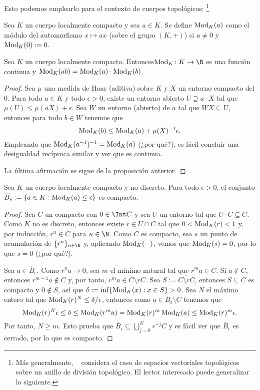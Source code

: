 \documentclass[teoria-numeros.tex]{subfiles}
\begin{document}
Esto podemos emplearlo para el contexto de cuerpos topológicos:%
\footnote{Más generalmente, \citeauthor{weil:basic}~\cite{weil:basic} considera el caso de espacios vectoriales topológicos
sobre un anillo de división topológico. El lector interesado puede generalizar lo siguiente.}
\begin{mydef}
	Sea $K$ un cuerpo localmente compacto y sea $a \in K$.
	Se define $\operatorname{Mod}_K(a)$ como el módulo del automorfismo $x \mapsto ax$ (sobre el grupo $(K, +)$) si $a \ne 0$ y $\operatorname{Mod}_K(0) := 0$.
\end{mydef}
\begin{prop}
	Sea $K$ un cuerpo localmente compacto.
	Entonces\break $\Mod_K \colon K \to \R$ es una función continua y $\operatorname{Mod}_K(ab) = \operatorname{Mod}_K(a) \cdot \operatorname{Mod}_K(b)$.
\end{prop}
\begin{proof}
	Sea $\mu$ una medida de Haar (aditiva) sobre $K$ y $X$ un entorno compacto del 0.
	Para todo $a \in K$ y todo $\epsilon > 0$, existe un entorno abierto $U \supseteq a\cdot X$ tal que $\mu(U) \le \mu(aX) + \epsilon$.
	Sea $W$ un entorno (abierto) de $a$ tal que $WX \subseteq U$, entonces para todo $b \in W$ tenemos que
	$$ \operatorname{Mod}_K(b) \le \operatorname{Mod}_K(a) + \mu(X)^{-1}\epsilon. $$
	Empleando que $\operatorname{Mod}_K(a^{-1})^{-1} = \operatorname{Mod}_K(a)$ (¿por qué?), es fácil concluir una desigualdad recíproca similar y ver que es continua.

	La última afirmación se sigue de la proposición anterior.
\end{proof}

\begin{thm}
	Sea $K$ un cuerpo localmente compacto y no discreto.
	Para todo $\epsilon > 0$, el conjunto $\overline{B}_\epsilon := \{ a \in K : \operatorname{Mod}_K(a) \le \epsilon \}$ es compacto.
\end{thm}
\begin{proof}
	Sea $C$ un compacto con $0 \in \Int C$ y sea $U$ un entorno tal que $U\cdot C \subseteq C$.
	Como $K$ no es discreto, entonces existe $r \in U \cap C$ tal que $0 < \operatorname{Mod}_K(r) < 1$ y, por inducción, $r^n \in C$ para $n \in \N$.
	Como $C$ es compacto, sea $s$ un punto de acumulación de $\{ r^n \}_{n\in\N}$ y, aplicando $\operatorname{Mod}_K(-)$, vemos que $\operatorname{Mod}_K(s) = 0$,
	por lo que $s = 0$ (¿por qué?).

	Sea $a \in \overline{B}_\epsilon$. Como $r^n a \to 0$, sea $m$ el mínimo natural tal que $r^m a \in C$.
	Si $a \notin C$, entonces $r^{m-1} a \notin C$ y, por tanto, $r^m a \in C \setminus rC$.
	Sea $S := \overline{C \setminus rC}$, entonces $S \subseteq C$ es compacto y $0 \notin S$, así que $\delta := \inf\{ \operatorname{Mod}_K(x) : x \in S \} > 0$.
	Sea $N$ el máximo entero tal que $\operatorname{Mod}_K(r)^N \le \delta / \epsilon$, entonces como $a \in \overline{B}_\epsilon \setminus C$ tenemos que
	$$ \operatorname{Mod}_K(r)^N \epsilon \le \delta \le \operatorname{Mod}_K(r^m a) = \operatorname{Mod}_K(r)^m \operatorname{Mod}_K(a) \le \operatorname{Mod}_K(r)^m \epsilon. $$
	Por tanto, $N \ge m$.
	Esto prueba que $\overline{B}_\epsilon \subseteq \bigcup_{j=0}^{N} r^{-j} C$ y es fácil ver que $\overline{B}_\epsilon$ es cerrado,
	por lo que es compacto.
\end{proof}
\end{document}
